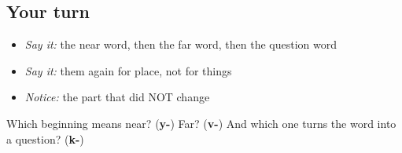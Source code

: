 \subsection*{Your turn}
\begin{itemize}
\raggedright
  \item \emph{Say it:} the near word, then the far word, then the question word
  \item \emph{Say it:} them again for place, not for things
  \item \emph{Notice:} the part that did NOT change
\end{itemize}

\begin{tcolorbox}[breakable,colback=teal!4,colframe=teal!35!black,title={Before you move on}]
Which beginning means near? (\textbf{y-}) Far? (\textbf{v-}) And which one turns the word into a question? (\textbf{k-})
\end{tcolorbox}
